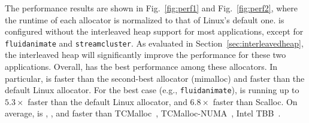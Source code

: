 The performance results are shown in Fig.~\ref{fig:perf1} and Fig.~\ref{fig:perf2}, where the runtime of each allocator is normalized to that of Linux's default one. \NM{} is configured without the interleaved heap support for most applications, except for \texttt{fluidanimate} and \texttt{streamcluster}. As evaluated in Section~\ref{sec:interleavedheap}, the interleaved heap will significantly improve the performance for these two applications. 
Overall, \NM{} has the best performance among these allocators. In particular, \NM{} is  faster than the second-best allocator (mimalloc) and  faster than the default Linux allocator. %
For the best case (e.g., \texttt{fluidanimate}), \NM{} is running up to $5.3\times$ faster than the default Linux allocator, and $6.8\times$ faster than Scalloc.
On average, \NM{} is , , and  faster than TCMalloc~\cite{tcmalloc2}, TCMalloc-NUMA~\cite{tcmallocnuma}, Intel TBB~\cite{tbb3}. 

